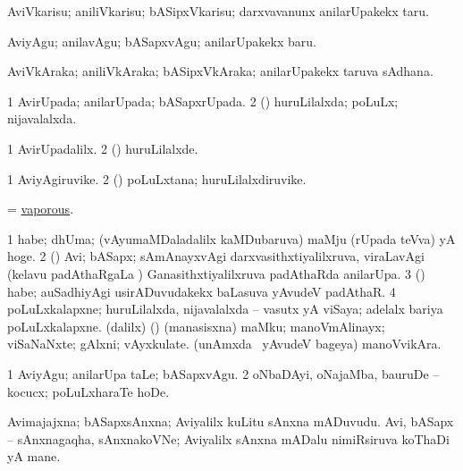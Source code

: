 \bentry
{} 
\gl{\sakirx}
\expl{}
\bmng
 AviVkarisu; aniliVkarisu; bASipxVkarisu; darxvavanunx anilarUpakekx taru. 
\emng

\noindent 
\gl{\akirx}
\expl{}
\bmng
 AviyAgu; anilavAgu; bASapxvAgu; anilarUpakekx baru. 
\emng
\eentry

\bentry
{} 
\gl{\nA}
\expl{}
\bmng
 AviVkAraka; aniliVkAraka; bASipxVkAraka; anilarUpakekx taruva sAdhana. 
\emng
\eentry

\bentry
{} 
\gl{\gu}
\expl{}
\bmng
\bnum
\num{1} AvirUpada; anilarUpada; bASapxrUpada. 
\num{2} (\rUpa) huruLilalxda; poLuLx; nijavalalxda. 
\enum
\emng
\eentry

\bentry
{} 
\gl{\kirxvi}
\expl{}
\bmng
\bnum
\num{1} AvirUpadalilx. 
\num{2} (\rUpa) huruLilalxde. 
\enum
\emng
\eentry

\bentry
{} 
\gl{\nA}
\expl{}
\bmng
\bnum
\num{1} AviyAgiruvike. 
\num{2} (\rUpa) poLuLxtana; huruLilalxdiruvike. 
\enum
\emng
\eentry

\bentry
{} 
\gl{\gu}
\expl{}
\bmng
 = \hyperlink{vaporous}{vaporous}. 
\emng
\eentry

\bentry 
{} 
\gl{\nA}
\bmng
\bnum
\num{1} habe; dhUma; (vAyumaMDaladalilx kaMDubaruva) maMju (rUpada teVva) yA hoge. 
\num{2} (\Bwvi) Avi; bASapx; sAmAnayxvAgi darxvasithxtiyalilxruva, viraLavAgi (kelavu padAthaRgaLa \vi) Ganasithxtiyalilxruva padAthaRda anilarUpa. 
\num{3} (\veYshA) habe; auSadhiyAgi usirADuvudakekx baLasuva yAvudeV padAthaR. 
\num{4} poLuLxkalapxne; huruLilalxda, nijavalalxda -- vasutx yA viSaya;  adelalx bariya poLuLxkalapxne. 
 (\bava dalilx) (\pArxparx) 
\banum
{} (manasisxna) maMku; manoVmAlinayx; viSaNaNxte; gAlxni; vAyxkulate. 
 (unAmxda \mo\ yAvudeV bageya) manoVvikAra. 
\eanum
\numie
\enum
\emng
\eentry

\bentry
{} 
\gl{\akirx}
\expl{}
\bmng
\bnum
\num{1} AviyAgu; anilarUpa taLe; bASapxvAgu. 
\num{2} oNbaDAyi, oNajaMba, bauruDe -- kocucx; poLuLxharaTe hoDe. 
\enum
\emng
\eentry

\bentry
{}
\gl{\nA}
\expl{}
\bmng
\banum
{} Avimajajxna; bASapxsAnxna; Aviyalilx kuLitu sAnxna mADuvudu. 
 Avi, bASapx -- sAnxnagaqha, sAnxnakoVNe; Aviyalilx sAnxna mADalu nimiRsiruva koThaDi yA mane. 
\eanum
\emng
\eentry

